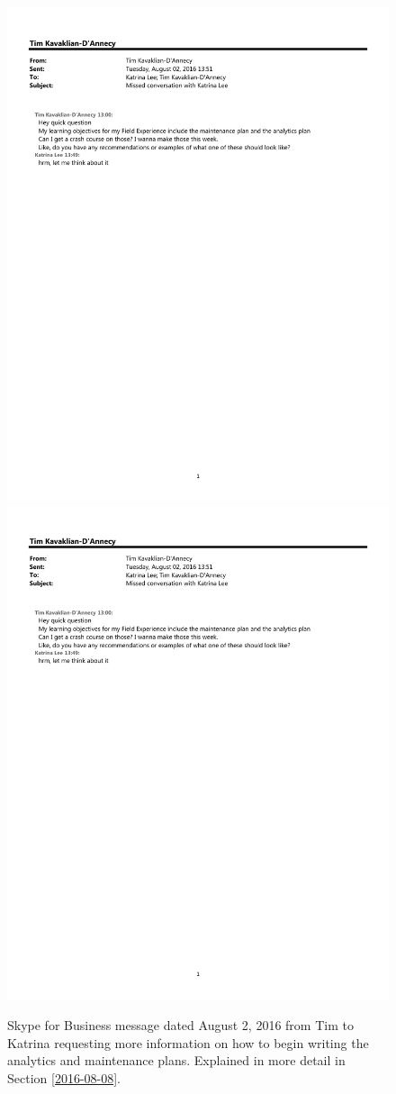 \begin{figure}
  \centering
        \noindent\includegraphics[page=1,width=.45\textwidth]{documents/2016-08-02-Message-Tim-Katrina} \hfill 
        \noindent\includegraphics[page=2,width=.45\textwidth]{documents/2016-08-02-Message-Tim-Katrina} \hfill
 \caption{Skype for Business message dated August 2, 2016 from Tim to Katrina requesting more information on how to begin writing the analytics and maintenance plans. Explained in more detail in Section \ref{2016-08-08}.}
 \label{fig:2016-08-02-Message-Tim-Katrina}
\end{figure}

